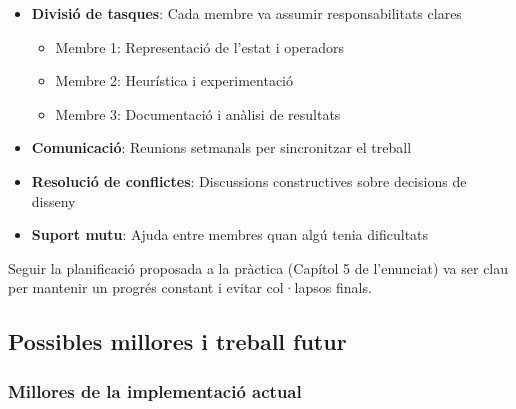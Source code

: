 \begin{itemize}
    \item \textbf{Divisió de tasques}: Cada membre va assumir responsabilitats clares
    \begin{itemize}
        \item Membre 1: Representació de l'estat i operadors
        \item Membre 2: Heurística i experimentació
        \item Membre 3: Documentació i anàlisi de resultats
    \end{itemize}
    
    \item \textbf{Comunicació}: Reunions setmanals per sincronitzar el treball
    
    \item \textbf{Resolució de conflictes}: Discussions constructives sobre decisions de disseny
    
    \item \textbf{Suport mutu}: Ajuda entre membres quan algú tenia dificultats
\end{itemize}

Seguir la planificació proposada a la pràctica (Capítol 5 de l'enunciat) va ser clau per mantenir un progrés constant i evitar col·lapsos finals.

\subsection{Possibles millores i treball futur}

\subsubsection{Millores de la implementació actual}

